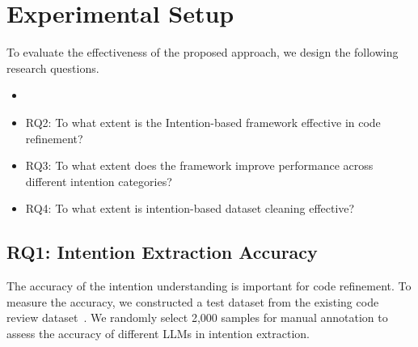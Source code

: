 \section{Experimental Setup}
To evaluate the effectiveness of the proposed approach, we design the following research questions.
\begin{itemize}[leftmargin=*,topsep=2pt]
    \item {}
    \item RQ2: To what extent is the Intention-based framework effective in code refinement?
    \item RQ3: To what extent does the framework improve performance across different intention categories?
    \item RQ4: To what extent is intention-based dataset cleaning effective?
\end{itemize}









 

\subsection{RQ1: Intention Extraction Accuracy}
The accuracy of the intention understanding is important for code refinement. 
To measure the accuracy, we constructed a test dataset from the existing code review dataset~\cite{li2022automating}. We randomly select 2,000 samples for manual annotation to assess the accuracy of different LLMs in intention extraction. 


